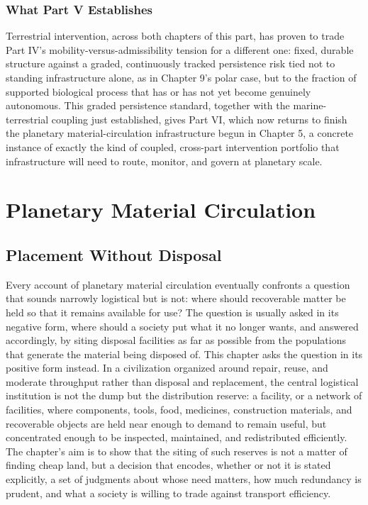 \documentclass[11pt,oneside]{book}
\begin{document}
\section*{What Part V Establishes}

Terrestrial intervention, across both chapters of this part, has proven to trade Part IV's mobility-versus-admissibility tension for a different one: fixed, durable structure against a graded, continuously tracked persistence risk tied not to standing infrastructure alone, as in Chapter 9's polar case, but to the fraction of supported biological process that has or has not yet become genuinely autonomous. This graded persistence standard, together with the marine-terrestrial coupling just established, gives Part VI, which now returns to finish the planetary material-circulation infrastructure begun in Chapter 5, a concrete instance of exactly the kind of coupled, cross-part intervention portfolio that infrastructure will need to route, monitor, and govern at planetary scale.

\part{Planetary Material Circulation}

\setcounter{chapter}{4}
\chapter{Placement Without Disposal}

Every account of planetary material circulation eventually confronts a question that sounds narrowly logistical but is not: where should recoverable matter be held so that it remains available for use? The question is usually asked in its negative form, where should a society put what it no longer wants, and answered accordingly, by siting disposal facilities as far as possible from the populations that generate the material being disposed of. This chapter asks the question in its positive form instead. In a civilization organized around repair, reuse, and moderate throughput rather than disposal and replacement, the central logistical institution is not the dump but the distribution reserve: a facility, or a network of facilities, where components, tools, food, medicines, construction materials, and recoverable objects are held near enough to demand to remain useful, but concentrated enough to be inspected, maintained, and redistributed efficiently. The chapter's aim is to show that the siting of such reserves is not a matter of finding cheap land, but a decision that encodes, whether or not it is stated explicitly, a set of judgments about whose need matters, how much redundancy is prudent, and what a society is willing to trade against transport efficiency.
\end{document}
